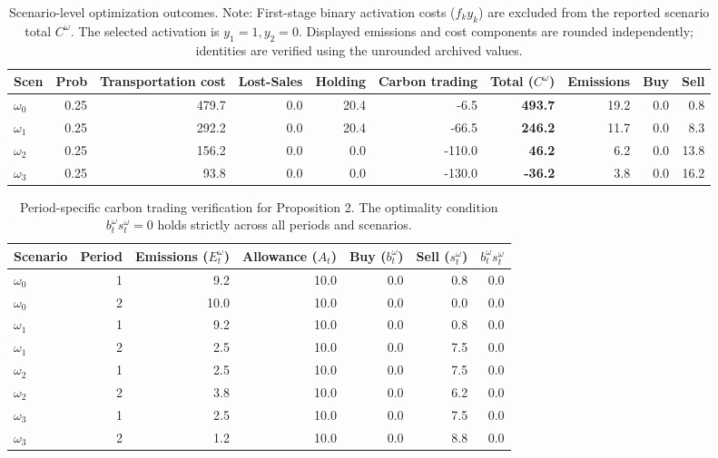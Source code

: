\documentclass[11pt,a4paper]{article}
\begin{document}
\begin{table}[ht]\small
\centering
\caption{Scenario-level optimization outcomes. Note: First-stage binary activation costs ($f_k y_k$) are excluded from the reported scenario total $C^\omega$. The selected activation is $y_1=1, y_2=0$. Displayed emissions and cost components are rounded independently; identities are verified using the unrounded archived values.}
\begin{tabular}{lrrrrrrrrr}
\toprule
Scen & Prob & Transportation cost & Lost-Sales & Holding & Carbon trading & Total ($C^\omega$) & Emissions & Buy & Sell \\
\midrule
$\omega_{0}$ & 0.25 & 479.7 & 0.0 & 20.4 & -6.5 & \textbf{493.7} & 19.2 & 0.0 & 0.8 \\
$\omega_{1}$ & 0.25 & 292.2 & 0.0 & 20.4 & -66.5 & \textbf{246.2} & 11.7 & 0.0 & 8.3 \\
$\omega_{2}$ & 0.25 & 156.2 & 0.0 & 0.0 & -110.0 & \textbf{46.2} & 6.2 & 0.0 & 13.8 \\
$\omega_{3}$ & 0.25 & 93.8 & 0.0 & 0.0 & -130.0 & \textbf{-36.2} & 3.8 & 0.0 & 16.2 \\
\bottomrule
\end{tabular}
\label{tab:scenarios}
\end{table}

\begin{table}[ht]\small
\centering
\caption{Period-specific carbon trading verification for Proposition 2. The optimality condition $b_t^\omega s_t^\omega = 0$ holds strictly across all periods and scenarios.}
\begin{tabular}{lrrrrrr}
\toprule
Scenario & Period & Emissions ($E_t^\omega$) & Allowance ($A_t$) & Buy ($b_t^\omega$) & Sell ($s_t^\omega$) & $b_t^\omega s_t^\omega$ \\
\midrule
$\omega_{0}$ & 1 & 9.2 & 10.0 & 0.0 & 0.8 & 0.0 \\
$\omega_{0}$ & 2 & 10.0 & 10.0 & 0.0 & 0.0 & 0.0 \\
$\omega_{1}$ & 1 & 9.2 & 10.0 & 0.0 & 0.8 & 0.0 \\
$\omega_{1}$ & 2 & 2.5 & 10.0 & 0.0 & 7.5 & 0.0 \\
$\omega_{2}$ & 1 & 2.5 & 10.0 & 0.0 & 7.5 & 0.0 \\
$\omega_{2}$ & 2 & 3.8 & 10.0 & 0.0 & 6.2 & 0.0 \\
$\omega_{3}$ & 1 & 2.5 & 10.0 & 0.0 & 7.5 & 0.0 \\
$\omega_{3}$ & 2 & 1.2 & 10.0 & 0.0 & 8.8 & 0.0 \\
\bottomrule
\end{tabular}
\label{tab:carbon_period}
\end{table}
\end{document}
